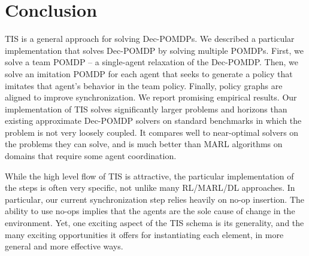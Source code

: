 \documentclass[runningheads]{llncs}
\newcommand{\commentout}[1]{}
\begin{document}

\section{Conclusion}

TIS is a general  approach for solving Dec-POMDPs. We described a particular implementation that solves Dec-POMDP by solving multiple POMDPs. First, we solve a team POMDP -- a single-agent relaxation of the Dec-POMDP. Then, we solve an imitation POMDP for each agent that seeks to
generate a policy that imitates that agent's behavior in the team policy. Finally, policy
graphs are aligned to improve synchronization. 
We report promising empirical results. Our implementation of TIS solves significantly larger problems and horizons than existing approximate Dec-POMDP solvers on standard benchmarks in which the problem is not very loosely coupled. It compares well to near-optimal solvers on the problems they can solve, and is much better than MARL algorithms on domains that require some agent coordination.

While the high level flow of TIS is attractive, the particular implementation of the steps is often very specific, not unlike many RL/MARL/DL approaches. In particular, our current synchronization step relies heavily on no-op insertion.
The ability to use no-ops implies that the agents are the sole cause of change in the environment. 
Yet, one exciting aspect of the  TIS schema is its generality, and the many exciting opportunities it offers for instantiating each element, in more general and more effective ways.


\commentout{
future research. For example: (1) One can obviously replace the POMDP solver we used with a single agent RL algorithm that handles partial observability.
(2) Alternative formulations of the imitation POMDPs are possible. (3) The {\em Imitate} step provides a new challenge for imitation learning. It calls for developing new techniques that address the information mismatch between the expert (team) and the agent. Because the agent has sensing actions, it can not only try to emulate the expert, but may also introduce actions that attempt to emulate the expert's belief state. Algorithms that address (1) and (3) combined, would yield a new MARL algorithm. (4) Smarter algorithms for the {\em Synchronize} step.  (5) An iterative process, in which the team problem is modified to take into account limitations of distributed behavior. These and other problems open exciting future opportunities. 
}
\end{document}
